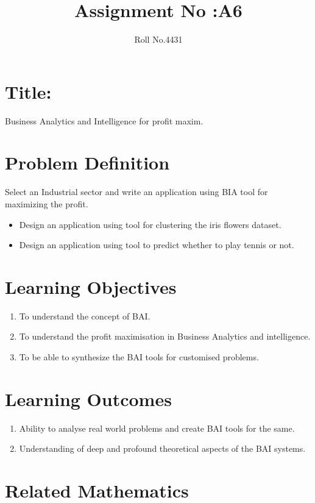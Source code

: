 \documentclass[10pt,a4paper]{article}
\title{Assignment No :A6}
\date{}
\author{Roll No.4431}
\begin{document}
\maketitle
\section{Title:}
Business Analytics and Intelligence for profit maxim.

\section{Problem Definition}
Select an Industrial sector and write an application using BIA tool for maximizing the profit.

\begin{itemize}
	\item Design an application using tool for clustering the iris flowers dataset.
	\item Design an application using tool to predict whether to play tennis or not.
\end{itemize}

\section{Learning Objectives}
\begin{enumerate}
\item To understand the concept of BAI.
\item To understand the profit maximisation in Business Analytics and intelligence.
\item To be able to synthesize the BAI tools for customised problems.
\end{enumerate}

\section{Learning Outcomes}
\begin{enumerate}
\item Ability to analyse real world problems and create BAI tools for the same.
\item Understanding of deep and profound theoretical aspects of the BAI systems.
\end{enumerate}


\section{Related Mathematics}
\end{document}
